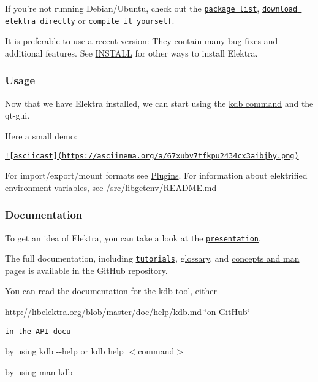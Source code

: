 If you're not running Debian/\+Ubuntu, check out the \href{#packages}{\tt package list}, \href{#download}{\tt download elektra directly} or \href{#compiling}{\tt compile it yourself}.

It is preferable to use a recent version\+: They contain many bug fixes and additional features. See \hyperlink{doc_INSTALL_md}{I\+N\+S\+T\+A\+L\+L} for other ways to install Elektra.

\subsubsection*{Usage}

Now that we have Elektra installed, we can start using the \hyperlink{md_doc_help_kdb_doc_help_kdb_md}{kdb command} and the qt-\/gui.

Here a small demo\+:

\href{https://asciinema.org/a/67xubv7tfkpu2434cx3aibjby}{\tt !\mbox{[}asciicast\mbox{]}(https\+://asciinema.\+org/a/67xubv7tfkpu2434cx3aibjby.\+png)}

For import/export/mount formats see \hyperlink{md_src_plugins_README_src_plugins_README_md}{Plugins}. For information about elektrified environment variables, see \hyperlink{md_src_libs_getenv_README_src_libs_getenv_README_md}{/src/libgetenv/\+R\+E\+A\+D\+M\+E.md}

\subsubsection*{Documentation}

To get an idea of Elektra, you can take a look at the \href{http://www.libelektra.org/ftp/elektra/presentations/2016/FOSDEM/fosdem.odp}{\tt presentation}.

The full documentation, including \href{http://libelektra.org/blob/master/doc/tutorials/}{\tt tutorials}, \hyperlink{md_doc_help_elektra-glossary_doc_help_elektra-glossary_md}{glossary}, and \hyperlink{md_doc_help_elektra-introduction_doc_help_elektra-introduction_md}{concepts and man pages} is available in the Git\+Hub repository.

You can read the documentation for the kdb tool, either


\begin{DoxyItemize}
\item http\+://libelektra.org/blob/master/doc/help/kdb.\+md \char`\"{}on Git\+Hub\char`\"{}
\item \href{http://doc.libelektra.org/api/latest/html/md_doc_help_kdb.html}{\tt in the A\+P\+I docu}
\item by using {\ttfamily kdb -\/-\/help} or {\ttfamily kdb help $<$command$>$}
\item by using {\ttfamily man kdb}
\end{DoxyItemize}

